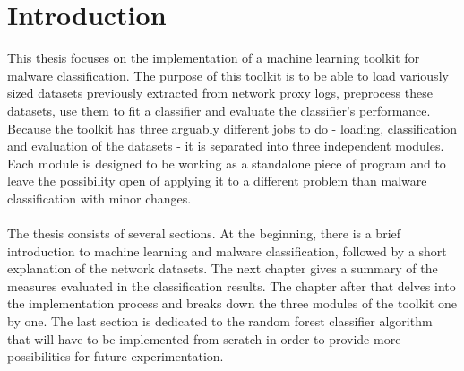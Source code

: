 \documentclass{article}
\begin{document}
  \section*{Introduction}
    This thesis focuses on the implementation of a machine learning toolkit for malware classification. The purpose of this toolkit is to be able to load variously sized datasets previously extracted from network proxy logs, preprocess these datasets, use them to fit a classifier and evaluate the classifier's performance. Because the toolkit has three arguably different jobs to do - loading, classification and evaluation of the datasets - it is separated into three independent modules. Each module is designed to be working as a standalone piece of program and to leave the possibility open of applying it to a different problem than malware classification with minor changes.
    \\~\\
    The thesis consists of several sections. At the beginning, there is a brief introduction to machine learning and malware classification, followed by a short explanation of the network datasets. The next chapter gives a summary of the measures evaluated in the classification results. The chapter after that delves into the implementation process and breaks down the three modules of the toolkit one by one. The last section is dedicated to the random forest classifier algorithm that will have to be implemented from scratch in order to provide more possibilities for future experimentation.
  \newpage
\end{document}
